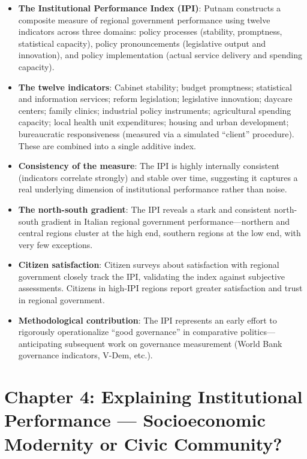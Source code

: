 \documentclass[12pt]{article}
\begin{document}
\begin{itemize}[leftmargin=*, itemsep=4pt]
    \item \textbf{The Institutional Performance Index (IPI)}: Putnam constructs a composite measure of regional government performance using twelve indicators across three domains: policy processes (stability, promptness, statistical capacity), policy pronouncements (legislative output and innovation), and policy implementation (actual service delivery and spending capacity).
    \item \textbf{The twelve indicators}: Cabinet stability; budget promptness; statistical and information services; reform legislation; legislative innovation; daycare centers; family clinics; industrial policy instruments; agricultural spending capacity; local health unit expenditures; housing and urban development; bureaucratic responsiveness (measured via a simulated ``client'' procedure). These are combined into a single additive index.
    \item \textbf{Consistency of the measure}: The IPI is highly internally consistent (indicators correlate strongly) and stable over time, suggesting it captures a real underlying dimension of institutional performance rather than noise.
    \item \textbf{The north-south gradient}: The IPI reveals a stark and consistent north-south gradient in Italian regional government performance---northern and central regions cluster at the high end, southern regions at the low end, with very few exceptions.
    \item \textbf{Citizen satisfaction}: Citizen surveys about satisfaction with regional government closely track the IPI, validating the index against subjective assessments. Citizens in high-IPI regions report greater satisfaction and trust in regional government.
    \item \textbf{Methodological contribution}: The IPI represents an early effort to rigorously operationalize ``good governance'' in comparative politics---anticipating subsequent work on governance measurement (World Bank governance indicators, V-Dem, etc.).
\end{itemize}

\section{Chapter 4: Explaining Institutional Performance --- Socioeconomic Modernity or Civic Community?}
\end{document}
